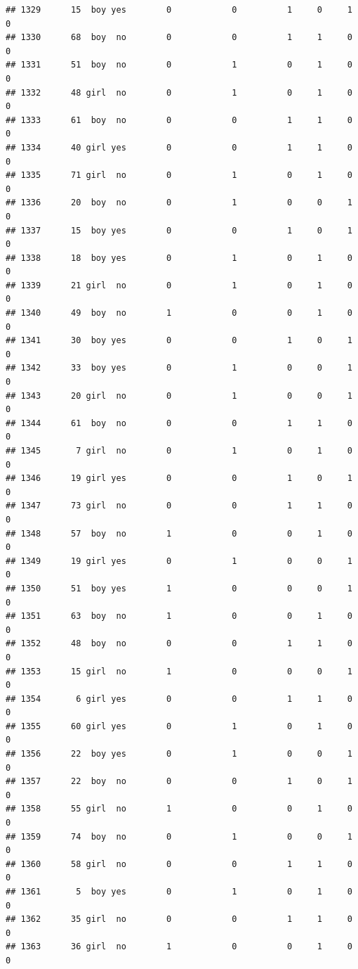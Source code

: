 \documentclass[man]{apa6}
\begin{document}
\begin{verbatim}
## 1329      15  boy yes        0            0          1     0     1     0
## 1330      68  boy  no        0            0          1     1     0     0
## 1331      51  boy  no        0            1          0     1     0     0
## 1332      48 girl  no        0            1          0     1     0     0
## 1333      61  boy  no        0            0          1     1     0     0
## 1334      40 girl yes        0            0          1     1     0     0
## 1335      71 girl  no        0            1          0     1     0     0
## 1336      20  boy  no        0            1          0     0     1     0
## 1337      15  boy yes        0            0          1     0     1     0
## 1338      18  boy yes        0            1          0     1     0     0
## 1339      21 girl  no        0            1          0     1     0     0
## 1340      49  boy  no        1            0          0     1     0     0
## 1341      30  boy yes        0            0          1     0     1     0
## 1342      33  boy yes        0            1          0     0     1     0
## 1343      20 girl  no        0            1          0     0     1     0
## 1344      61  boy  no        0            0          1     1     0     0
## 1345       7 girl  no        0            1          0     1     0     0
## 1346      19 girl yes        0            0          1     0     1     0
## 1347      73 girl  no        0            0          1     1     0     0
## 1348      57  boy  no        1            0          0     1     0     0
## 1349      19 girl yes        0            1          0     0     1     0
## 1350      51  boy yes        1            0          0     0     1     0
## 1351      63  boy  no        1            0          0     1     0     0
## 1352      48  boy  no        0            0          1     1     0     0
## 1353      15 girl  no        1            0          0     0     1     0
## 1354       6 girl yes        0            0          1     1     0     0
## 1355      60 girl yes        0            1          0     1     0     0
## 1356      22  boy yes        0            1          0     0     1     0
## 1357      22  boy  no        0            0          1     0     1     0
## 1358      55 girl  no        1            0          0     1     0     0
## 1359      74  boy  no        0            1          0     0     1     0
## 1360      58 girl  no        0            0          1     1     0     0
## 1361       5  boy yes        0            1          0     1     0     0
## 1362      35 girl  no        0            0          1     1     0     0
## 1363      36 girl  no        1            0          0     1     0     0

\end{verbatim}
\end{document}

